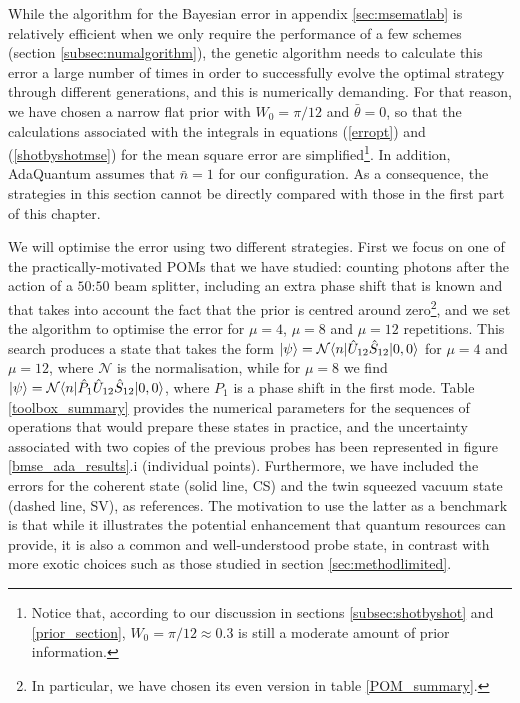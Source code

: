 While the algorithm for the Bayesian error in appendix \ref{sec:msematlab} is relatively efficient when we only require the performance of a few schemes (section \ref{subsec:numalgorithm}), the genetic algorithm needs to calculate this error a large number of times in order to successfully evolve the optimal strategy through different generations, and this is numerically demanding. For that reason, we have chosen a narrow flat prior with $W_0 = \pi/12$ and $\bar{\theta} = 0$, so that the calculations associated with the integrals in equations (\ref{erropt}) and (\ref{shotbyshotmse}) for the mean square error are simplified\footnote{Notice that, according to our discussion in sections \ref{subsec:shotbyshot} and \ref{prior_section}, $W_0 = \pi/12 \approx 0.3$ is still a moderate amount of prior information.}. In addition, AdaQuantum assumes that $\bar{n} = 1$ for our configuration. As a consequence, the strategies in this section cannot be directly compared with those in the first part of this chapter.

We will optimise the error using two different strategies. First we focus on one of the practically-motivated POMs that we have studied: counting photons after the action of a $50$:$50$ beam splitter, including an extra phase shift that is known and that takes into account the fact that the prior is centred around zero\footnote{In particular, we have chosen its even version in table \ref{POM_summary}.}, and we set the algorithm to optimise the error for $\mu = 4$, $\mu = 8$ and $\mu = 12$ repetitions. This search produces a state that takes the form $\ket{\psi} = \mathcal{N}\langle n|\hat{U}_{12}\hat{S}_{12}|0,0\rangle$ for $\mu = 4$ and $\mu=12$, where $\mathcal{N}$ is the normalisation, while for $\mu = 8$ we find $\ket{\psi} = \mathcal{N}\langle n|\hat{P}_1\hat{U}_{12}\hat{S}_{12}|0,0\rangle$, where $P_1$ is a phase shift in the first mode. Table \ref{toolbox_summary} provides the numerical parameters for the sequences of operations that would prepare these states in practice, and the uncertainty associated with two copies of the previous probes has been represented in figure \ref{bmse_ada_results}.i (individual points). Furthermore, we have included the errors for the coherent state (solid line, CS) and the twin squeezed vacuum state (dashed line, SV), as references. The motivation to use the latter as a benchmark is that while it illustrates the potential enhancement that quantum resources can provide, it is also a common and well-understood probe state, in contrast with more exotic choices such as those studied in section \ref{sec:methodlimited}. 

